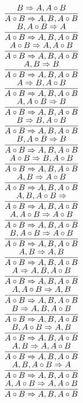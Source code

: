 \documentclass[11pt]{article}
\begin{document}
\begin{center}
\\$\infer{A\circ B\Rightarrow A, B, A\circ B}{B\Rightarrow A, A\circ B}$
\bigskip
\\$\infer{A\circ B\Rightarrow A, B, A\circ B}{B, A\circ B\Rightarrow A}$
\bigskip
\\$\infer{A\circ B\Rightarrow A, B, A\circ B}{A\circ B\Rightarrow A, A\circ B}$
\bigskip
\\$\infer{A\circ B\Rightarrow A, B, A\circ B}{A, B\Rightarrow B}$
\bigskip
\\$\infer{A\circ B\Rightarrow A, B, A\circ B}{A\Rightarrow B, A\circ B}$
\bigskip
\\$\infer{A\circ B\Rightarrow A, B, A\circ B}{A, A\circ B\Rightarrow B}$
\bigskip
\\$\infer{A\circ B\Rightarrow A, B, A\circ B}{B\Rightarrow B, A\circ B}$
\bigskip
\\$\infer{A\circ B\Rightarrow A, B, A\circ B}{B, A\circ B\Rightarrow B}$
\bigskip
\\$\infer{A\circ B\Rightarrow A, B, A\circ B}{A\circ B\Rightarrow B, A\circ B}$
\bigskip
\\$\infer{A\circ B\Rightarrow A, B, A\circ B}{A, B\Rightarrow A\circ B}$
\bigskip
\\$\infer{A\circ B\Rightarrow A, B, A\circ B}{A, B, A\circ B\Rightarrow }$
\bigskip
\\$\infer{A\circ B\Rightarrow A, B, A\circ B}{A, A\circ B\Rightarrow A\circ B}$
\bigskip
\\$\infer{A\circ B\Rightarrow A, B, A\circ B}{B, A\circ B\Rightarrow A\circ B}$
\bigskip
\\$\infer{A\circ B\Rightarrow A, B, A\circ B}{A, B\Rightarrow A, B}$
\bigskip
\\$\infer{A\circ B\Rightarrow A, B, A\circ B}{A\Rightarrow A, B, A\circ B}$
\bigskip
\\$\infer{A\circ B\Rightarrow A, B, A\circ B}{A, A\circ B\Rightarrow A, B}$
\bigskip
\\$\infer{A\circ B\Rightarrow A, B, A\circ B}{B\Rightarrow A, B, A\circ B}$
\bigskip
\\$\infer{A\circ B\Rightarrow A, B, A\circ B}{B, A\circ B\Rightarrow A, B}$
\bigskip
\\$\infer{A\circ B\Rightarrow A, B, A\circ B}{A, B\Rightarrow A, A\circ B}$
\bigskip
\\$\infer{A\circ B\Rightarrow A, B, A\circ B}{A, B, A\circ B\Rightarrow A}$
\bigskip
\\$\infer{A\circ B\Rightarrow A, B, A\circ B}{A, A\circ B\Rightarrow A, A\circ B}$

\end{center}
\end{document}
